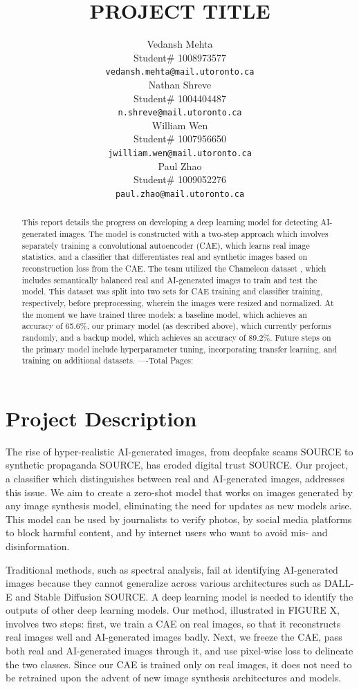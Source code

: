 \documentclass{article} %
\title{PROJECT TITLE}
\author{Vedansh Mehta  \\
Student\# 1008973577 \\
\texttt{vedansh.mehta@mail.utoronto.ca} \\
\And
Nathan Shreve  \\
Student\# 1004404487 \\
\texttt{n.shreve@mail.utoronto.ca} \\
\AND
William Wen  \\
Student\# 1007956650 \\
\texttt{jwilliam.wen@mail.utoronto.ca} \\
\And
Paul Zhao \\
Student\# 1009052276 \\
\texttt{paul.zhao@mail.utoronto.ca} \\
\AND
}
\begin{document}
\maketitle

\begin{abstract}
    This report details the progress on developing a deep learning model for detecting AI-generated images. The model is constructed with a two-step approach which involves separately training a convolutional autoencoder (CAE), which learns real image statistics, and a classifier that differentiates real and synthetic images based on reconstruction loss from the CAE. The team utilized the Chameleon dataset \citep{yan2024sanity}, which includes semantically balanced real and AI-generated images to train and test the model. This dataset was split into two sets for CAE training and classifier training, respectively, before preprocessing, wherein the images were resized and normalized. At the moment we have trained three models: a baseline model, which achieves an accuracy of 65.6\%, our primary model (as described above), which currently performs randomly, and a backup model, which achieves an accuracy of 89.2\%. Future steps on the primary model include hyperparameter tuning, incorporating transfer learning, and training on additional datasets.
    ----Total Pages: \pageref{last_page}
\end{abstract}



\section{Project Description}
\label{project_description}

The rise of hyper-realistic AI-generated images, from deepfake scams SOURCE to synthetic propaganda SOURCE, has eroded digital trust SOURCE. Our project, a classifier which distinguishes between real and AI-generated images, addresses this issue. We aim to create a zero-shot model that works on images generated by any image synthesis model, eliminating the need for updates as new models arise. This model can be used by journalists to verify photos, by social media platforms to block harmful content, and by internet users who want to avoid mis- and disinformation.


Traditional methods, such as spectral analysis, fail at identifying AI-generated images because they cannot generalize across various architectures such as DALL-E and Stable Diffusion SOURCE. A deep learning model is needed to identify the outputs of other deep learning models. Our method, illustrated in FIGURE X, involves two steps: first, we train a CAE on real images, so that it reconstructs real images well and AI-generated images badly. Next, we freeze the CAE, pass both real and AI-generated images through it, and use pixel-wise loss to delineate the two classes. Since our CAE is trained only on real images, it does not need to be retrained upon the advent of new image synthesis architectures and models.
\end{document}
